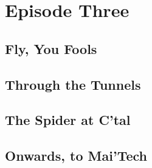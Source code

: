 \documentclass[././main.tex]{subfiles}
\begin{document}
\section{Episode Three}
\subsection{Fly, You Fools}
\subsection{Through the Tunnels}
\subsection{The Spider at C'tal}
\subsection{Onwards, to Mai'Tech}
\end{document}
